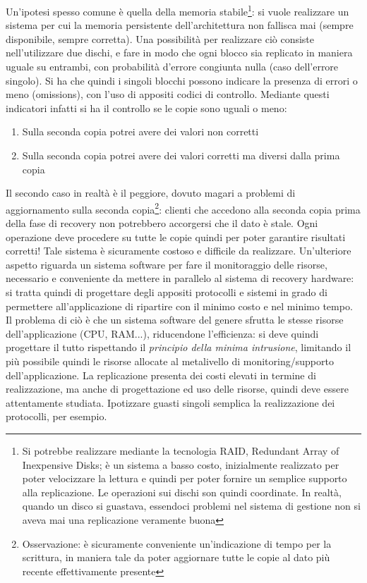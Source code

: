 Un'ipotesi spesso comune è quella della memoria stabile\footnote{Si potrebbe realizzare mediante la tecnologia RAID,
Redundant Array of Inexpensive Disks; è un sistema a basso costo, inizialmente realizzato per poter velocizzare la
lettura e quindi per poter fornire un semplice supporto alla replicazione. Le operazioni sui dischi son quindi
coordinate. In realtà, quando un disco si guastava, essendoci problemi nel sistema di gestione non si aveva mai una
replicazione veramente buona}: si vuole realizzare un sistema per cui la memoria persistente dell'architettura non
fallisca mai (sempre disponibile, sempre corretta). Una possibilità per realizzare ciò consiste nell'utilizzare due
dischi, e fare in modo che ogni blocco sia replicato in maniera uguale su entrambi, con probabilità d'errore congiunta
nulla (caso dell'errore singolo). Si ha che quindi i singoli blocchi possono indicare la presenza di errori o meno
(omissions), con l'uso di appositi codici di controllo. Mediante questi indicatori infatti si ha il controllo se le
copie sono uguali o meno:
\begin{enumerate}
 \item Sulla seconda copia potrei avere dei valori non corretti
 \item Sulla seconda copia potrei avere dei valori corretti ma diversi dalla prima copia
\end{enumerate}
Il secondo caso in realtà è il peggiore, dovuto magari a problemi di aggiornamento sulla seconda
copia\footnote{Osservazione: è sicuramente conveniente un'indicazione di tempo per la scrittura, in maniera tale da
poter aggiornare tutte le copie al dato più recente effettivamente presente}: clienti che accedono alla seconda copia
prima della fase di recovery non potrebbero accorgersi che il dato è stale. Ogni operazione deve procedere su tutte le
copie quindi per poter garantire risultati corretti! Tale sistema è sicuramente costoso e difficile da realizzare.
Un'ulteriore aspetto riguarda un sistema software per fare il monitoraggio delle risorse, necessario e conveniente da
mettere in parallelo al sistema di recovery hardware: si tratta quindi di progettare degli appositi protocolli e sistemi
in grado di permettere all'applicazione di ripartire con il minimo costo e nel minimo tempo. Il problema di ciò è che un
sistema software del genere sfrutta le stesse risorse dell'applicazione (CPU, RAM...), riducendone l'efficienza: si
deve quindi progettare il tutto rispettando il \textit{principio della minima intrusione}, limitando il più possibile
quindi le risorse allocate al metalivello di monitoring/supporto dell'applicazione. La replicazione presenta dei costi
elevati in termine di realizzazione, ma anche di progettazione ed uso delle risorse, quindi deve essere attentamente
studiata. Ipotizzare guasti singoli semplica la realizzazione dei protocolli, per esempio.

